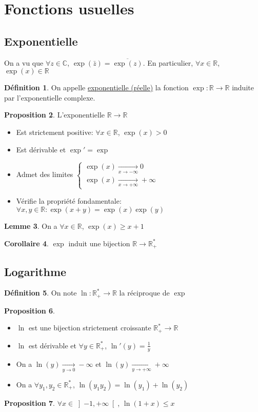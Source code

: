 \documentclass[10pt,a4paper]{article}
\theoremstyle{definition}
\newtheorem{proposition}{Proposition}[section]
\newtheorem{corollaire}[proposition]{Corollaire}
\newtheorem{lemme}[proposition]{Lemme}
\newtheorem{definition}[proposition]{Définition}
\begin{document}
\section{Fonctions usuelles}
\subsection{Exponentielle}
On a vu que $\forall z \in \mathbb{C}$, $\exp(\bar{z}) = \overline{\exp(z)}$. En particulier, $\forall x \in \mathbb{R}$, $\exp(x) \in \mathbb{R}$
\begin{definition}
On appelle \uline{exponentielle (réelle)} la fonction $\exp: \mathbb{R} \to \mathbb{R}$ induite par l'exponentielle complexe.
\end{definition}
\begin{proposition}
L'exponentielle $\mathbb{R} \to \mathbb{R}$
\begin{itemize}
\item Est strictement positive: $\forall x \in \mathbb{R}$, $\exp(x) > 0$
\item Est dérivable et $\exp' = \exp$
\item Admet des limites $\begin{cases}
\exp(x) \xrightarrow[x \to -\infty]{} 0 \\
\exp(x) \xrightarrow[x \to +\infty]{} +\infty
\end{cases}$
\item Vérifie la propriété fondamentale: $\forall x, y \in \mathbb{R}: \exp(x + y) = \exp(x) \exp(y)$
\end{itemize}
\end{proposition}
\begin{lemme}
On a $\forall x \in \mathbb{R}$, $\exp(x) \geq x + 1$
\end{lemme}
\begin{corollaire}
$\exp$ induit une bijection $\mathbb{R} \to \mathbb{R}_+^*$
\end{corollaire}

\subsection{Logarithme}
\begin{definition}
On note $\ln: \mathbb{R}_+^* \to \mathbb{R}$ la réciproque de $\exp$
\end{definition}
\begin{proposition}
\hfill
\begin{itemize}
\item $\ln$ est une bijection strictement croissante $\mathbb{R}_+^* \to \mathbb{R}$
\item $\ln$ est dérivable et $\forall y \in \mathbb{R}_+^*$, $\ln'(y) = \frac{1}{y}$
\item On a $\ln(y) \xrightarrow[y \to 0]{} -\infty$ et $\ln(y) \xrightarrow[y \to +\infty]{} +\infty$
\item On a $\forall y_1, y_2 \in \mathbb{R}_+^*$, $\ln(y_1 y_2) = \ln(y_1) + \ln(y_2)$
\end{itemize}
\end{proposition}
\begin{proposition}
$\forall x \in \left] -1, +\infty \right[$, $\ln(1 + x) \leq x$
\end{proposition}
\end{document}
